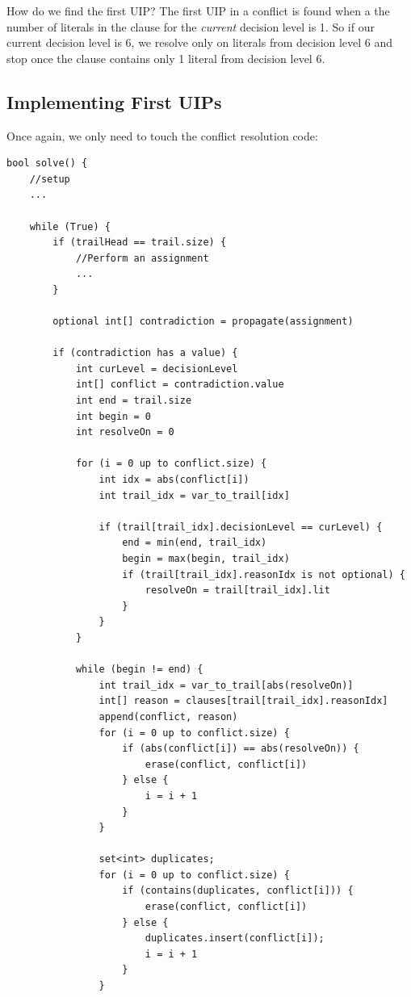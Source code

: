 \documentclass[../main.tex]{subfiles}
\begin{document}
How do we find the first UIP? The first UIP in a conflict is found when a the number 
of literals in the clause for the \textit{current} decision level is 1. So if our current 
decision level is 6, we resolve only on literals from decision level 6 and stop once the 
clause contains only 1 literal from decision level 6.

\subsection{Implementing First UIPs}

Once again, we only need to touch the conflict resolution code:

\begin{lstlisting}
bool solve() {
    //setup
    ...

    while (True) {
        if (trailHead == trail.size) {
            //Perform an assignment
            ...
        }

        optional int[] contradiction = propagate(assignment)

        if (contradiction has a value) {
            int curLevel = decisionLevel
            int[] conflict = contradiction.value
            int end = trail.size
            int begin = 0
            int resolveOn = 0

            for (i = 0 up to conflict.size) {
                int idx = abs(conflict[i])
                int trail_idx = var_to_trail[idx]

                if (trail[trail_idx].decisionLevel == curLevel) {
                    end = min(end, trail_idx)
                    begin = max(begin, trail_idx)
                    if (trail[trail_idx].reasonIdx is not optional) {
                        resolveOn = trail[trail_idx].lit
                    }
                }
            }

            while (begin != end) {
                int trail_idx = var_to_trail[abs(resolveOn)]
                int[] reason = clauses[trail[trail_idx].reasonIdx]
                append(conflict, reason)
                for (i = 0 up to conflict.size) {
                    if (abs(conflict[i]) == abs(resolveOn)) {
                        erase(conflict, conflict[i])
                    } else {
                        i = i + 1
                    }
                }

                set<int> duplicates;
                for (i = 0 up to conflict.size) {
                    if (contains(duplicates, conflict[i])) {
                        erase(conflict, conflict[i])
                    } else {
                        duplicates.insert(conflict[i]);
                        i = i + 1
                    }
                }


\end{lstlisting}
\end{document}
